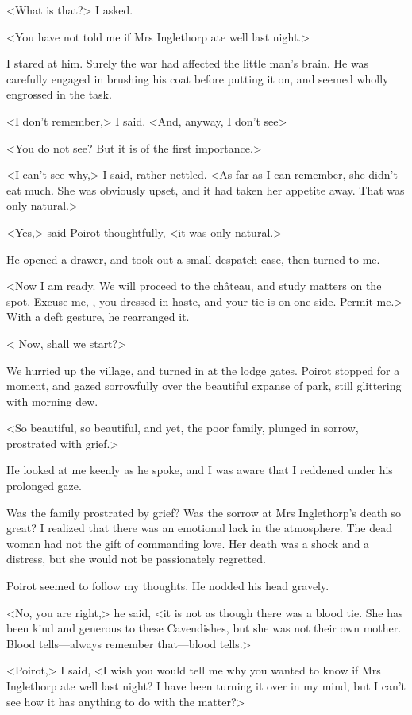  <What is that?> I asked. 

 <You have not told me if Mrs Inglethorp ate well last night.> 

 I stared at him. Surely the war had affected the little man's brain. He was carefully engaged in brushing his coat before putting it on, and seemed wholly engrossed in the task. 

 <I don't remember,> I said. <And, anyway, I don't see\longdash> 

 <You do not see? But it is of the first importance.> 

 <I can't see why,> I said, rather nettled. <As far as I can remember, she didn't eat much. She was obviously upset, and it had taken her appetite away. That was only natural.> 

 <Yes,> said Poirot thoughtfully, <it was only natural.> 

 He opened a drawer, and took out a small despatch-case, then turned to me. 

 <Now I am ready. We will proceed to the château, and study matters on the spot. Excuse me, , you dressed in haste, and your tie is on one side. Permit me.> With a deft gesture, he rearranged it. 

 < Now, shall we start?> 

 We hurried up the village, and turned in at the lodge gates. Poirot stopped for a moment, and gazed sorrowfully over the beautiful expanse of park, still glittering with morning dew. 

 <So beautiful, so beautiful, and yet, the poor family, plunged in sorrow, prostrated with grief.> 

 He looked at me keenly as he spoke, and I was aware that I reddened under his prolonged gaze. 

 Was the family prostrated by grief? Was the sorrow at Mrs Inglethorp's death so great? I realized that there was an emotional lack in the atmosphere. The dead woman had not the gift of commanding love. Her death was a shock and a distress, but she would not be passionately regretted. 

 Poirot seemed to follow my thoughts. He nodded his head gravely. 

 <No, you are right,> he said, <it is not as though there was a blood tie. She has been kind and generous to these Cavendishes, but she was not their own mother. Blood tells—always remember that—blood tells.> 

 <Poirot,> I said, <I wish you would tell me why you wanted to know if Mrs Inglethorp ate well last night? I have been turning it over in my mind, but I can't see how it has anything to do with the matter?> 

